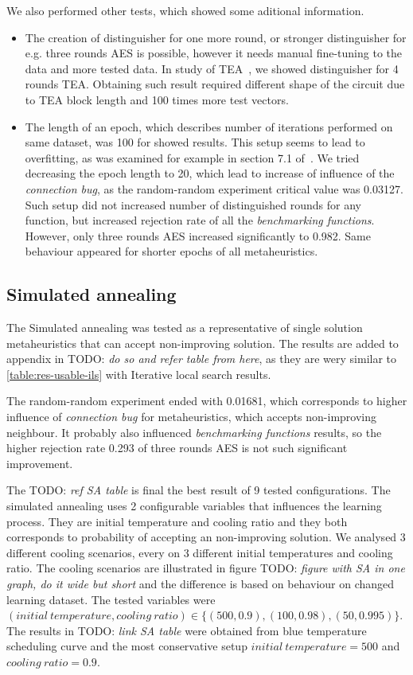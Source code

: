 \documentclass[
  print, %
  Table,   %
  nolof,     %
  nolot,     %
  11pt, %
  oneside  %
]{fithesis3}
\newcommand{\todo}[1]{TODO: \textit{#1}}
\begin{document}
We also performed other tests, which showed some aditional information.

\begin{itemize}
    \item The creation of distinguisher for one more round, or stronger distinguisher for e.g. three rounds AES is possible, however it needs manual fine-tuning to the data and more tested data. In study of TEA~\cite{kubicek2016new}, we showed distinguisher for 4 rounds TEA. Obtaining such result required different shape of the circuit due to TEA block length and 100 times more test vectors.
    \item The length of an epoch, which describes number of iterations performed on same dataset, was 100 for showed results. This setup seems to lead to overfitting, as was examined for example in section 7.1 of~\cite{ukropBcThesis}. We tried decreasing the epoch length to 20, which lead to increase of influence of the \textit{connection bug}, as the random-random experiment critical value was 0.03127. Such setup did not increased number of distinguished rounds for any function, but increased rejection rate of all the \textit{benchmarking functions}. However, only three rounds AES increased significantly to 0.982. Same behaviour appeared for shorter epochs of all metaheuristics.
\end{itemize}


\subsection{Simulated annealing}
\label{subsec:res-ss-sa}

The Simulated annealing was tested as a representative of single solution metaheuristics that can accept non-improving solution. The results are added to appendix in \todo{do so and refer table from here}, as they are wery similar to \cref{table:res-usable-ils} with Iterative local search results.

The random-random experiment ended with 0.01681, which corresponds to higher influence of \textit{connection bug} for metaheuristics, which accepts non-improving neighbour. It probably also influenced \textit{benchmarking functions} results, so the higher rejection rate 0.293 of three rounds AES is not such significant improvement.

The \todo{ref SA table} is final the best result of 9 tested configurations. The simulated annealing uses 2 configurable variables that influences the learning process. They are initial temperature and cooling ratio and they both corresponds to probability of accepting an non-improving solution. We analysed 3 different cooling scenarios, every on 3 different initial temperatures and cooling ratio. The cooling scenarios are illustrated in figure \todo{figure with SA in one graph, do it wide but short} and the difference is based on behaviour on changed learning dataset. The tested variables were $(\mathit{initial~temperature, cooling~ratio}) \in \{ (500, 0.9), (100, 0.98), (50, 0.995) \}$. The results in \todo{link SA table} were obtained from blue temperature scheduling curve and the most conservative setup $\mathit{initial~temperature} = 500$ and $\mathit{cooling~ratio} = 0.9$.
\end{document}
